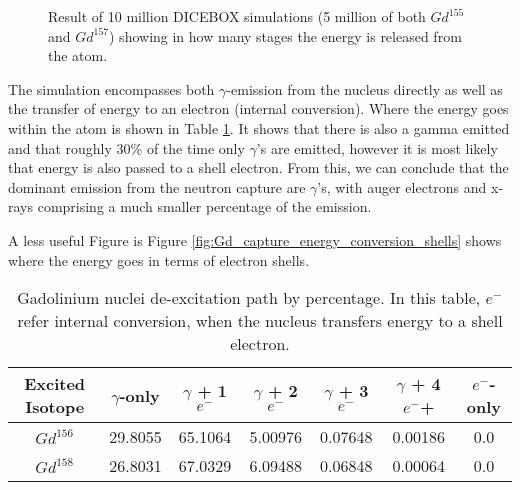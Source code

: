 \begin{figure}[!htbp]
    \centering
    \caption{Result of 10 million DICEBOX simulations (5 million of both $Gd^{155}$ and $Gd^{157}$) showing in how many stages the energy is released from the atom.}
    \label{fig:Gd_capture_resulting_particle_count}
\end{figure}

\par
The simulation encompasses both $\gamma$-emission from the nucleus directly as well as the transfer of energy to an electron (internal conversion).
Where the energy goes within the atom is shown in Table \ref{tab:Gd_internal_energy_conversion}.
It shows that there is also a gamma emitted and that roughly 30\% of the time only $\gamma$'s are emitted, however it is most likely that energy is also passed to a shell electron.
From this, we can conclude that the dominant emission from the neutron capture are $\gamma$'s, with auger electrons and x-rays comprising a much smaller percentage of the emission.
\par
A less useful Figure is Figure \ref{fig:Gd_capture_energy_conversion_shells} shows where the energy goes in terms of electron shells. 

\begin{table}[!htbp]
    \centering
    \begin{tabular}{c | c | c | c | c | c | c}
    \hline
    {Excited Isotope}  & {$\gamma$-only} & {$\gamma$ + 1$e^{-}$} & {$\gamma$ + 2$e^{-}$} & {$\gamma$ + 3$e^{-}$} & {$\gamma$ + 4$e^{-}$+} & {$e^{-}$-only}\\ \hline
    $Gd^{156}$         & 29.8055         & 65.1064               & 5.00976               & 0.07648               & 0.00186               & 0.0        \\
    $Gd^{158}$         & 26.8031         & 67.0329               & 6.09488               & 0.06848               & 0.00064               & 0.0
     
    \end{tabular}
    \caption{Gadolinium nuclei de-excitation path by percentage. In this table, $e^{-}$ refer internal conversion, when the nucleus transfers energy to a shell electron.}
    \label{tab:Gd_internal_energy_conversion}
\end{table} 

